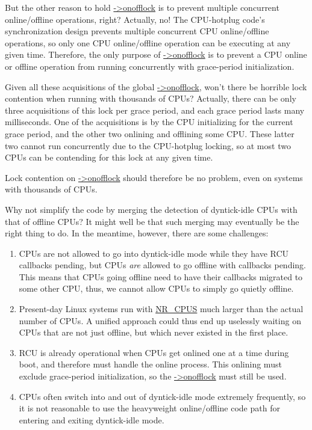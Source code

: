 \QuickQ{}
	But the other reason to hold \url{->onofflock} is to prevent
	multiple concurrent online/offline operations, right?
\QuickA{}
	Actually, no!
	The CPU-hotplug code's synchronization design prevents multiple
	concurrent CPU online/offline operations, so only one CPU
	online/offline operation can be executing at any given time.
	Therefore, the only purpose of \url{->onofflock} is to prevent a CPU
	online or offline operation from running concurrently with grace-period
	initialization.

\QuickQ{}
	Given all these acquisitions of the global \url{->onofflock},
	won't there
	be horrible lock contention when running with thousands of CPUs?
\QuickA{}
	Actually, there can be only three acquisitions of this lock per grace
	period, and each grace period lasts many milliseconds.
	One of the acquisitions is by the CPU initializing for the current
	grace period, and the other two onlining and offlining some CPU.
	These latter two cannot run concurrently due to the CPU-hotplug
	locking, so at most two CPUs can be contending for this lock at any
	given time.

	Lock contention on \url{->onofflock} should therefore
	be no problem, even on systems with thousands of CPUs.

\QuickQ{}
	Why not simplify the code by merging the detection of dyntick-idle
	CPUs with that of offline CPUs?
\QuickA{}
	It might well be that such merging may eventually be the right
	thing to do.
	In the meantime, however, there are some challenges:

	\begin{enumerate}
	\item	CPUs are not allowed to go into dyntick-idle mode while they
		have RCU callbacks pending, but CPUs \emph{are} allowed to go
		offline with callbacks pending.
		This means that CPUs going offline need to have their callbacks
		migrated to some other CPU, thus, we cannot allow CPUs to
		simply go quietly offline.
	\item	Present-day Linux systems run with \url{NR_CPUS}
		much larger than the actual number of CPUs.
		A unified approach could thus end up uselessly waiting on
		CPUs that are not just offline, but which never existed in
		the first place.
	\item	RCU is already operational when CPUs get onlined one
		at a time during boot, and therefore must handle the online
		process.
		This onlining must exclude grace-period initialization, so
		the \url{->onofflock} must still be used.
	\item	CPUs often switch into and out of dyntick-idle mode
		extremely frequently, so it is not reasonable to use the
		heavyweight online/offline code path for entering and exiting
		dyntick-idle mode.
	\end{enumerate}

